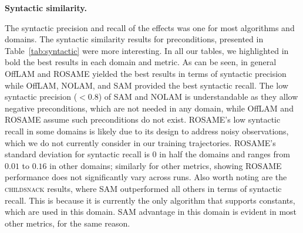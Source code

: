 \documentclass[letterpaper]{article} %
\newcommand{\pre}{\ensuremath{\textit{pre}}\xspace}
\newcommand{\eff}{\ensuremath{\textit{eff}}\xspace}
\newcommand{\nolam}{NOLAM\xspace}
\newcommand{\offlam}{OffLAM\xspace}
\newcommand{\rosame}{ROSAME\xspace}
\newcommand{\samshort}{SAM\xspace}
\newcommand{\miniparagraph}[1]{\textbf{#1.}}
\newif\ifaddcomments
\newcommand{\roni}[1]{\ifaddcomments{\textcolor{red}{[Roni: #1]}}\fi}
\newcommand{\leo}[1]{\ifaddcomments{\textcolor{pink}{[Leonardo: #1]}}\fi}
\begin{document}
\miniparagraph{Syntactic similarity} 
%

\roni{This is for preconditions, right? what about effects? I don't think we should show more though, just need to mention this}
\leo{Currently Table 3 reports the results aggregating both preconditions and effs, we can report only the preconditions precision if we prefer. The insights on preconditions and effects precision are currently in the supplementary, I can add more details here?}
\roni{I think this is Ok, but we need to explain how we aggregate the precondition and effects. You wrote sum but I'm not sure: how can 1.00 be the sum here?}
\leo{The cumulative precision $P$ for precs and effs is computed by summing over all lifted actions as follows:
\\
$P = \frac{TP}{TP + FP}$, where:
\\
 $TP = \sum_{a\in A}TP_\pre(a) + TP_\eff(a)$
 \\
 $FP = \sum_{a\in A}FP_\pre(a) + FP_\eff(a)$
 }
%
The syntactic precision and recall of the effects was one for most algorithms and domains. The syntactic similarity results for preconditions, presented in Table~\ref{tab:syntactic} were more interesting. In all our tables, we highlighted in bold the best results in each domain and metric. 
As can be seen, in general \offlam and \rosame yielded the best results in terms of syntactic precision 
while \offlam, \nolam, and \samshort provided the best syntactic recall. 
The low syntactic precision ($<0.8$) of \samshort and \nolam is understandable as they allow negative preconditions, which are not needed in any domain, while \offlam and \rosame assume such preconditions do not exist. 
\rosame's low syntactic recall in some domains is likely due to its design to address noisy observations, which we do not currently consider in our training trajectories. 
%
\rosame's standard deviation for syntactic recall is $0$ in half the domains and ranges from $0.01$ to $0.16$ in other domains; similarly for other metrics, showing \rosame performance does not significantly vary across runs. 
%
Also worth noting are the \textsc{childsnack} results, where \samshort outperformed all others in terms of syntactic recall. This is because it is currently the only algorithm that supports constants, which are used in this domain. \samshort advantage in this domain is evident in most other metrics, for the same reason. 
\end{document}
